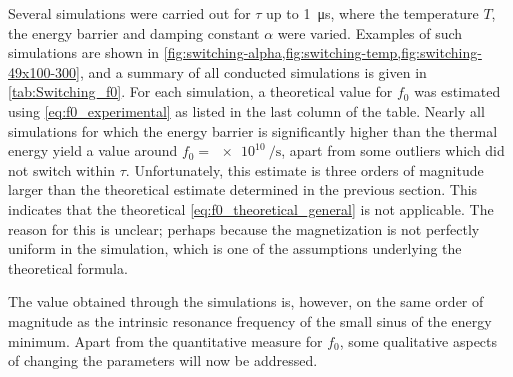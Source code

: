 \documentclass[11pt,a4paper,english]{article}
\begin{document}
Several simulations were carried out for $\tau$ up to \SI{1}{\micro\second}, where the temperature $T$, the energy barrier and damping constant $\alpha$ were varied. Examples of such simulations are shown in \cref{fig:switching-alpha,fig:switching-temp,fig:switching-49x100-300}, and a summary of all conducted simulations is given in \cref{tab:Switching_f0}. For each simulation, a theoretical value for $f_0$ was estimated using \cref{eq:f0_experimental} as listed in the last column of the table. 
Nearly all simulations for which the energy barrier is significantly higher than the thermal energy yield a value around $f_0=\SI{e10}{\per\second}$, apart from some outliers which did not switch within $\tau$. Unfortunately, this estimate is three orders of magnitude larger than the theoretical estimate determined in the previous section. This indicates that the theoretical \cref{eq:f0_theoretical_general} is not applicable. The reason for this is unclear; perhaps because the magnetization is not perfectly uniform in the simulation, which is one of the assumptions underlying the theoretical formula. \par
The value obtained through the simulations is, however, on the same order of magnitude as the intrinsic resonance frequency of the small sinus of the energy minimum.
Apart from the quantitative measure for $f_0$, some qualitative aspects of changing the parameters will now be addressed.
\end{document}
